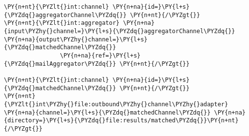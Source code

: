 \begin{Verbatim}[commandchars=\\\{\}]
\PY{n+nt}{\PYZlt{}int:channel} \PY{n+na}{id=}\PY{l+s}{\PYZdq{}aggregatorChannel\PYZdq{}} \PY{n+nt}{/\PYZgt{}}
\PY{n+nt}{\PYZlt{}int:aggregator} \PY{n+na}{input\PYZhy{}channel=}\PY{l+s}{\PYZdq{}aggregatorChannel\PYZdq{}} \PY{n+na}{output\PYZhy{}channel=}\PY{l+s}{\PYZdq{}matchedChannel\PYZdq{}} 
                \PY{n+na}{ref=}\PY{l+s}{\PYZdq{}mailAggregator\PYZdq{}} \PY{n+nt}{/\PYZgt{}}

\PY{n+nt}{\PYZlt{}int:channel} \PY{n+na}{id=}\PY{l+s}{\PYZdq{}matchedChannel\PYZdq{}} \PY{n+nt}{/\PYZgt{}}
\PY{n+nt}{\PYZlt{}int\PYZhy{}file:outbound\PYZhy{}channel\PYZhy{}adapter} \PY{n+na}{channel=}\PY{l+s}{\PYZdq{}matchedChannel\PYZdq{}} \PY{n+na}{directory=}\PY{l+s}{\PYZdq{}file:results/matched\PYZdq{}}\PY{n+nt}{/\PYZgt{}}
\end{Verbatim}
